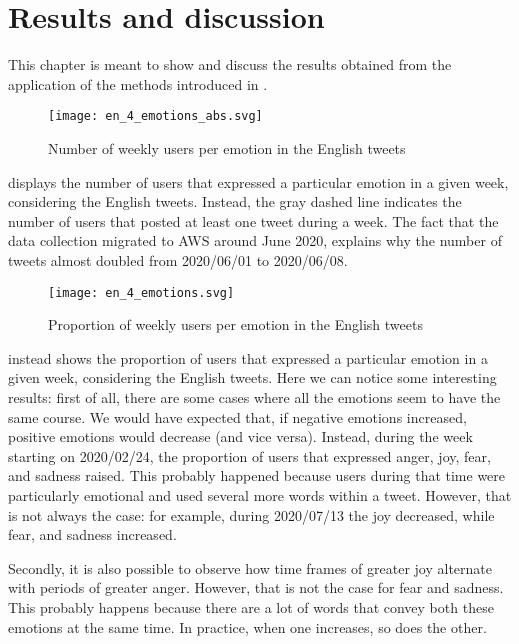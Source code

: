 \graphicspath{{chapters/chapter4/img/}}

\chapter{Results and discussion}
\label{cha:results}

This chapter is meant to show and discuss the results obtained from the application of the methods introduced in .

\begin{figure}[H]
	\centering
    	\texttt{[image: en\_4\_emotions\_abs.svg]}
    	\caption{Number of weekly users per emotion in the English tweets}
    	\label{fig:en-4-emotions-abs}
\end{figure}

 displays the number of users that expressed a particular emotion in a given week, considering the English tweets. Instead, the gray dashed line indicates the number of users that posted at least one tweet during a week. The fact that the data collection migrated to AWS around June 2020, explains why the number of tweets almost doubled from 2020/06/01 to 2020/06/08.

\begin{figure}[H]
	\centering
    	\texttt{[image: en\_4\_emotions.svg]}
    	\caption{Proportion of weekly users per emotion in the English tweets}
    	\label{fig:en-4-emotions}
\end{figure}

 instead shows the proportion of users that expressed a particular emotion in a given week, considering the English tweets. Here we can notice some interesting results: first of all, there are some cases where all the emotions seem to have the same course. We would have expected that, if negative emotions increased, positive emotions would decrease (and vice versa). Instead, during the week starting on 2020/02/24, the proportion of users that expressed anger, joy, fear, and sadness raised. This probably happened because users during that time were particularly emotional and used several more words within a tweet. However, that is not always the case: for example, during 2020/07/13 the joy decreased, while fear, and sadness increased.

Secondly, it is also possible to observe how time frames of greater joy alternate with periods of greater anger. However, that is not the case for fear and sadness. This probably happens because there are a lot of words that convey both these emotions at the same time. In practice, when one increases, so does the other.

